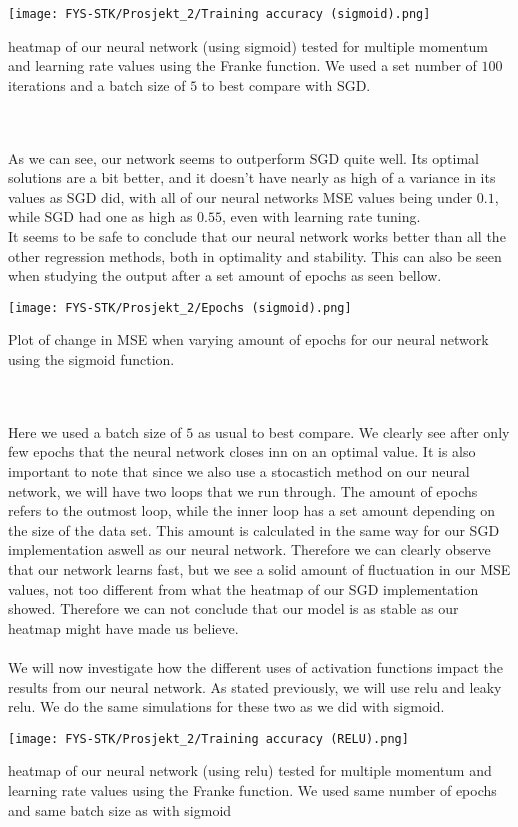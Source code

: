 \documentclass[english,notitlepage,reprint,nofootinbib]{revtex4-1}  %
\begin{document}
\texttt{[image: FYS-STK/Prosjekt\_2/Training accuracy (sigmoid).png]}
\caption{heatmap of our neural network (using sigmoid) tested for multiple momentum and learning rate values using the Franke function. We used a set number of $100$ iterations and a batch size of $5$ to best compare with SGD.}
\\
\\
As we can see, our network seems to outperform SGD quite well. Its optimal solutions are a bit better, and it doesn't have nearly as high of a variance in its values as SGD did, with all of our neural networks MSE values being under $0.1$, while SGD had one as high as $0.55$, even with learning rate tuning.
\\
It seems to be safe to conclude that our neural network works better than all the other regression methods, both in optimality and stability. This can also be seen when studying the output after a set amount of epochs as seen bellow.

\texttt{[image: FYS-STK/Prosjekt\_2/Epochs (sigmoid).png]}
\caption{Plot of change in MSE when varying amount of epochs for our neural network using the sigmoid function.}
\\
\\
Here we used a batch size of $5$ as usual to best compare. We clearly see after only few epochs that the neural network closes inn on an optimal value. It is also important to note that since we also use a stocastich method on our neural network, we will have two loops that we run through. The amount of epochs refers to the outmost loop, while the inner loop has a set amount depending on the size of the data set. This amount is calculated in the same way for our SGD implementation aswell as our neural network. Therefore we can clearly observe that our network learns fast, but we see a solid amount of fluctuation in our MSE values, not too different from what the heatmap of our SGD implementation showed. Therefore we can not conclude that our model is as stable as our heatmap might have made us believe. 
\\
\\
We will now investigate how the different uses of activation functions impact the results from our neural network. As stated previously, we will use relu and leaky relu. We do the same simulations for these two as we did with sigmoid.

\texttt{[image: FYS-STK/Prosjekt\_2/Training accuracy (RELU).png]}
\caption{heatmap of our neural network (using relu) tested for multiple momentum and learning rate values using the Franke function. We used same number of epochs and same batch size as with sigmoid}
\end{document}
